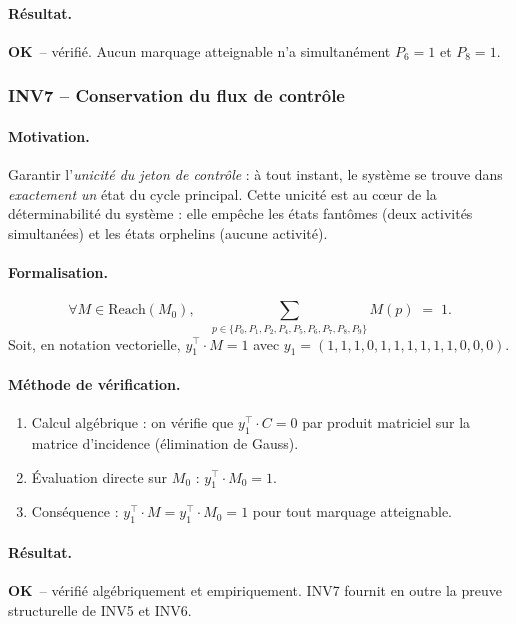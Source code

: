 \documentclass[11pt,a4paper]{article}
\newcommand{\OK}{\textcolor{green!50!black}{\textbf{OK}}}
\begin{document}
\paragraph{Résultat.}
\OK\ -- vérifié. Aucun marquage atteignable n'a simultanément $P_6 = 1$
et $P_8 = 1$.

\subsubsection*{INV7 -- Conservation du flux de contrôle}

\paragraph{Motivation.}
Garantir l'\emph{unicité du jeton de contrôle} : à tout instant, le système
se trouve dans \emph{exactement un} état du cycle principal. Cette unicité
est au cœur de la déterminabilité du système : elle empêche les états
fantômes (deux activités simultanées) et les états orphelins (aucune
activité).

\paragraph{Formalisation.}
\[
\forall M \in \mathrm{Reach}(M_0),\quad
\sum_{p \in \{P_0,P_1,P_2,P_4,P_5,P_6,P_7,P_8,P_9\}} M(p) \;=\; 1.
\]
Soit, en notation vectorielle, $y_1^\top \cdot M = 1$ avec
$y_1 = (1,1,1,0,1,1,1,1,1,1,0,0,0)$.

\paragraph{Méthode de vérification.}
\begin{enumerate}[leftmargin=1.2cm,itemsep=1pt]
  \item Calcul algébrique : on vérifie que $y_1^\top \cdot C = 0$ par
        produit matriciel sur la matrice d'incidence (élimination de
        Gauss).
  \item Évaluation directe sur $M_0$ : $y_1^\top \cdot M_0 = 1$.
  \item Conséquence : $y_1^\top \cdot M = y_1^\top \cdot M_0 = 1$ pour tout
        marquage atteignable.
\end{enumerate}

\paragraph{Résultat.}
\OK\ -- vérifié algébriquement et empiriquement. INV7 fournit en outre la
preuve structurelle de INV5 et INV6.
\end{document}
